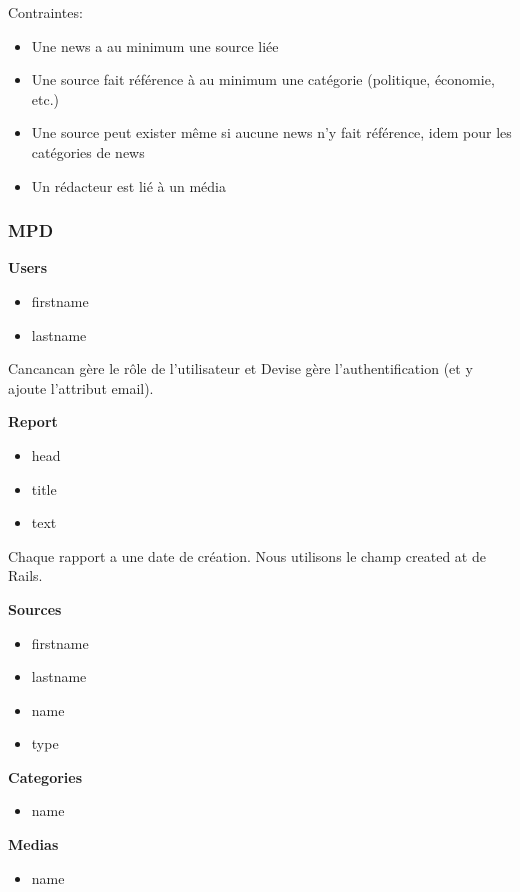\documentclass{article}
\begin{document}
Contraintes:
\begin{itemize}
\item Une news a au minimum une source liée
\item Une source fait référence à au minimum une catégorie (politique, économie, etc.)
\item Une source peut exister même si aucune news n'y fait référence, idem pour les catégories de news
\item Un rédacteur est lié à un média
\end{itemize}

\subsubsection{MPD}

\textbf{Users}

\begin{itemize}
\item firstname
\item lastname
\end{itemize}

Cancancan gère le rôle de l'utilisateur et Devise gère l'authentification (et y ajoute l'attribut email).

\textbf{Report}

\begin{itemize}
\item head
\item title
\item text
\end{itemize}

Chaque rapport a une date de création. Nous utilisons le champ created at de Rails.

\textbf{Sources}

\begin{itemize}
\item firstname
\item lastname
\item name
\item type
\end{itemize}

\textbf{Categories}

\begin{itemize}
\item name
\end{itemize}

\newpage
\textbf{Medias}

\begin{itemize}
\item name
\end{itemize}
\end{document}
